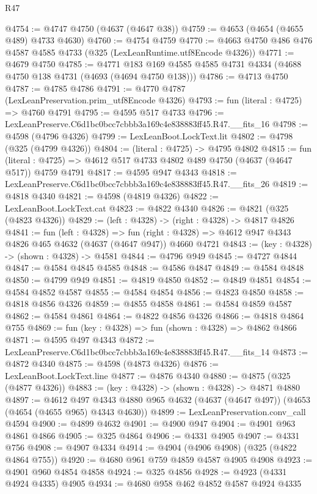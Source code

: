 \begin{lexlean}{R47}
\begin{coremodule}
@4754 := @4747 @4750 (@4637 (@4647 @38))
@4759 := @4653 (@4654 (@4655 @489) @4733 @4630)
@4760 := @4754 @4759
@4770 := @4663 @4750 @486 @476 @4587 @4585 @4733 (@325 (LexLeanRuntime.utf8Encode @4326))
@4771 := @4679 @4750
@4785 := @4771 @183 @169 @4585 @4585 @4731 @4334 (@4688 @4750 @138 @4731 (@4693 (@4694 @4750 @138)))
@4786 := @4713 @4750
@4787 := @4785 @4786
@4791 := @4770 @4787 (LexLeanPreservation.prim_utf8Encode @4326)
@4793 := fun (literal : @4725) => @4760 @4791
@4795 := @4595 @517 @4733
@4796 := LexLeanPreserve.C6d1bc0bcc7cbbb3a169c4e838883ff45.R47.__fits_16
@4798 := @4598 (@4796 @4326)
@4799 := LexLeanBoot.LockText.lit
@4802 := @4798 (@325 (@4799 @4326))
@4804 := (literal : @4725) -> @4795 @4802
@4815 := fun (literal : @4725) => @4612 @517 @4733 @4802 @489 @4750 (@4637 (@4647 @517)) @4759 @4791
@4817 := @4595 @947 @4343
@4818 := LexLeanPreserve.C6d1bc0bcc7cbbb3a169c4e838883ff45.R47.__fits_26
@4819 := @4818 @4340
@4821 := @4598 (@4819 @4326)
@4822 := LexLeanBoot.LockText.cat
@4823 := @4822 @4340
@4826 := @4821 (@325 (@4823 @4326))
@4829 := (left : @4328) -> (right : @4328) -> @4817 @4826
@4841 := fun (left : @4328) =>
  fun (right : @4328) => @4612 @947 @4343 @4826 @465 @4632 (@4637 (@4647 @947)) @4660 @4721
@4843 := (key : @4328) -> (shown : @4328) -> @4581
@4844 := @4796 @949
@4845 := @4727 @4844
@4847 := @4584 @4845 @4585
@4848 := @4586 @4847
@4849 := @4584 @4848
@4850 := @4799 @949
@4851 := @4819 @4850
@4852 := @4849 @4851
@4854 := @4584 @4852 @4587
@4855 := @4584 @4854
@4856 := @4823 @4850
@4858 := @4818 @4856 @4326
@4859 := @4855 @4858
@4861 := @4584 @4859 @4587
@4862 := @4584 @4861
@4864 := @4822 @4856 @4326
@4866 := @4818 @4864 @755
@4869 := fun (key : @4328) => fun (shown : @4328) => @4862 @4866
@4871 := @4595 @497 @4343
@4872 := LexLeanPreserve.C6d1bc0bcc7cbbb3a169c4e838883ff45.R47.__fits_14
@4873 := @4872 @4340
@4875 := @4598 (@4873 @4326)
@4876 := LexLeanBoot.LockText.line
@4877 := @4876 @4340
@4880 := @4875 (@325 (@4877 @4326))
@4883 := (key : @4328) -> (shown : @4328) -> @4871 @4880
@4897 := @4612
    @497
    @4343
    @4880
    @965
    @4632
    (@4637 (@4647 @497))
    (@4653 (@4654 (@4655 @965) @4343 @4630))
@4899 := LexLeanPreservation.conv_call @4594
@4900 := @4899 @4632
@4901 := @4900 @947
@4904 := @4901 @963 @4861 @4866
@4905 := @325 @4864
@4906 := @4331 @4905
@4907 := @4331 @756
@4908 := @4907 @4334
@4914 := @4904 (@4906 @4908) (@325 (@4822 @4864 @755))
@4920 := @4680 @961 @759 @4859 @4587 @4905 @4908
@4923 := @4901 @960 @4854 @4858
@4924 := @325 @4856
@4928 := @4923 (@4331 @4924 @4335) @4905
@4934 := @4680 @958 @462 @4852 @4587 @4924 @4335

\end{coremodule}
\end{lexlean}
